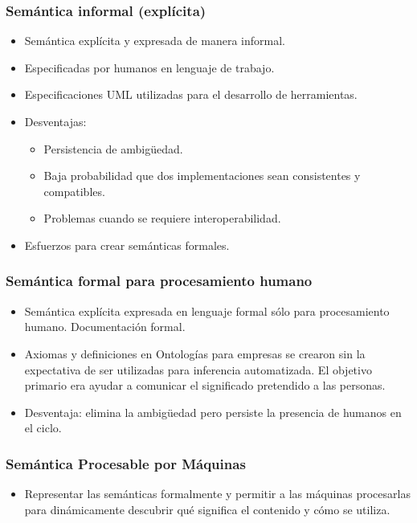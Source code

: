 \documentclass[a4paper,12pt,twoside,final,spanish]{article}
\begin{document}
\subsubsection{Semántica informal (explícita)}
	\begin{itemize}
	\item Semántica explícita y expresada de manera informal.
	\item Especificadas por humanos en lenguaje de trabajo.
	\item Especificaciones UML utilizadas para el desarrollo de herramientas.
	\item Desventajas:
		\begin{itemize}
		\item Persistencia de ambigüedad.
		\item Baja probabilidad que dos implementaciones sean consistentes y 					compatibles.
		\item Problemas cuando se requiere interoperabilidad.
		\end{itemize}
	\item Esfuerzos para crear semánticas formales.
	\end{itemize}
	
\subsubsection{Semántica formal para procesamiento humano}
	\begin{itemize}
	\item Semántica explícita expresada en lenguaje formal sólo para procesamiento 			humano. Documentación formal.
	\item Axiomas y definiciones en Ontologías para empresas se crearon sin la 				expectativa de ser utilizadas para inferencia automatizada. El objetivo primario 		era ayudar a comunicar el significado pretendido a las personas.
	\item Desventaja: elimina la ambigüedad pero persiste la presencia de 					humanos en el ciclo.
	\end{itemize}

\subsubsection{Semántica Procesable por Máquinas}
	\begin{itemize}
	\item Representar las semánticas formalmente y permitir a las máquinas procesarlas 	para dinámicamente descubrir qué significa el contenido y cómo se utiliza.
	\end{itemize}
\end{document}
